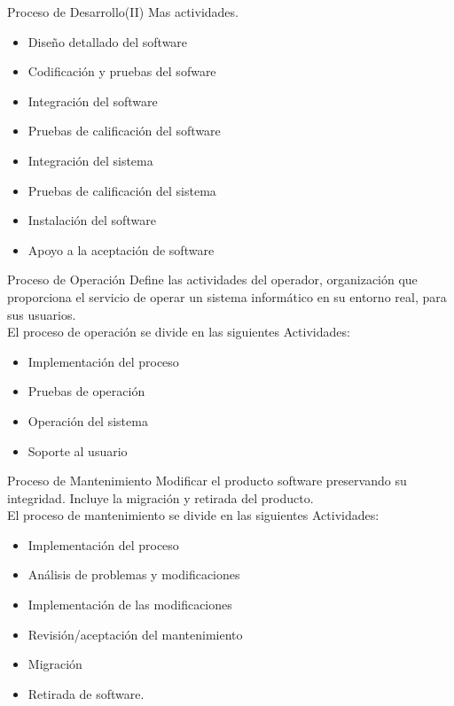 \documentclass{beamer}
\begin{document}
			
			\begin{frame}{Proceso de Desarrollo(II)}
				Mas actividades.\pause
					\begin{itemize}
		 				\item Diseño detallado del software\pause
						\item Codificación y pruebas del sofware\pause
						\item Integración del software\pause
						\item Pruebas de calificación del software\pause
						\item Integración del sistema\pause
						\item Pruebas de calificación del sistema\pause
						\item Instalación del software\pause
						\item Apoyo a la aceptación de software
					\end{itemize}
			\end{frame}
			
			\begin{frame}{Proceso de Operación}
				Define las actividades del operador, organización que proporciona el servicio de operar un sistema informático en su entorno real, para sus usuarios.\\

					El proceso de operación se divide en las siguientes Actividades:\pause
					\begin{itemize}
						\item Implementación del proceso\pause
						\item Pruebas de operación\pause
						\item Operación del sistema\pause
						\item Soporte al usuario
					\end{itemize}
			\end{frame}
			
			\begin{frame}{Proceso de Mantenimiento}
				Modificar el producto software preservando su integridad. Incluye la migración y retirada del producto.\\
				
				El proceso de mantenimiento se divide en las siguientes Actividades:\pause
				\begin{itemize}
					\item Implementación del proceso\pause
					\item Análisis de problemas y modificaciones\pause
					\item Implementación de las modificaciones\pause
					\item Revisión/aceptación del mantenimiento\pause
					\item Migración\pause
					\item Retirada de software.\pause
				\end{itemize}
			\end{frame}
			
\end{document}
